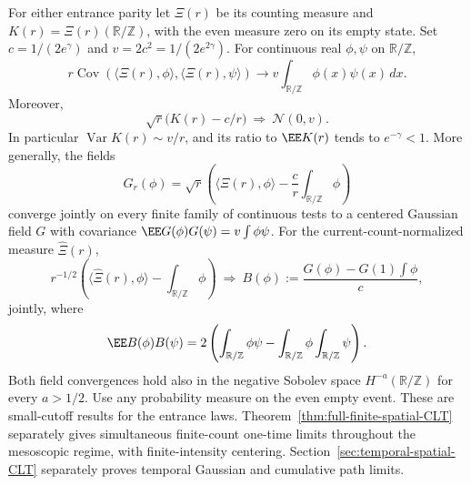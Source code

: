 \documentclass[11pt,letterpaper]{article}
\newcommand{\T}{\mathbb R/\mathbb Z}\newcommand{\Leb}{\operatorname{Leb}}
\begin{document}
\begin{theorem}\label{thm:entrance-fluctuations}
For either entrance parity let $\Xi(r)$ be its counting measure and
$K(r)=\Xi(r)(\T)$, with the even measure zero on its empty state.
Set $c=1/(2e^\gamma)$ and $v=2c^2=1/(2e^{2\gamma})$.
For continuous real $\phi,\psi$ on $\T$,
\begin{equation}\label{eq:entrance-covariance}
 r\operatorname{Cov}(\langle\Xi(r),\phi\rangle,
                     \langle\Xi(r),\psi\rangle)
       \longrightarrow v\int_{\T}\phi(x)\psi(x)\,dx.
\end{equation}
Moreover,
\begin{equation}\label{eq:entrance-count-clt}
 \sqrt r\big(K(r)-c/r\big)\ \Longrightarrow\ \mathcal N(0,v).
\end{equation}
In particular $\operatorname{Var}K(r)\sim v/r$, and its ratio to
$\EE K(r)$ tends to $e^{-\gamma}<1$.
More generally, the fields
\[
 G_r(\phi)=\sqrt r\left(\langle\Xi(r),\phi\rangle
                            -\frac c r\int_{\T}\phi\right)
\]
converge jointly on every finite family of continuous tests to a centered
Gaussian field $G$ with covariance $\EE G(\phi)G(\psi)=v\int\phi\psi$.
For the current-count-normalized measure $\widehat\Xi(r)$,
\begin{equation}\label{eq:normalized-gaussian}
 r^{-1/2}\left(\langle\widehat\Xi(r),\phi\rangle-\int_{\T}\phi\right)
 \ \Longrightarrow\ B(\phi):=\frac{G(\phi)-G(1)\int\phi}{c},
\end{equation}
jointly, where
\[
 \EE B(\phi)B(\psi)=2\left(\int_{\T}\phi\psi
                              -\int_{\T}\phi\int_{\T}\psi\right).
\]
Both field convergences hold also in the negative Sobolev space
$H^{-a}(\T)$ for every $a>1/2$. Use any probability measure on the even
empty event. These are small-cutoff results for the entrance laws.
Theorem~\ref{thm:full-finite-spatial-CLT} separately gives simultaneous
finite-count one-time limits throughout the mesoscopic regime, with
finite-intensity centering. Section~\ref{sec:temporal-spatial-CLT}
separately proves temporal Gaussian and cumulative path limits.
\end{theorem}
\end{document}

